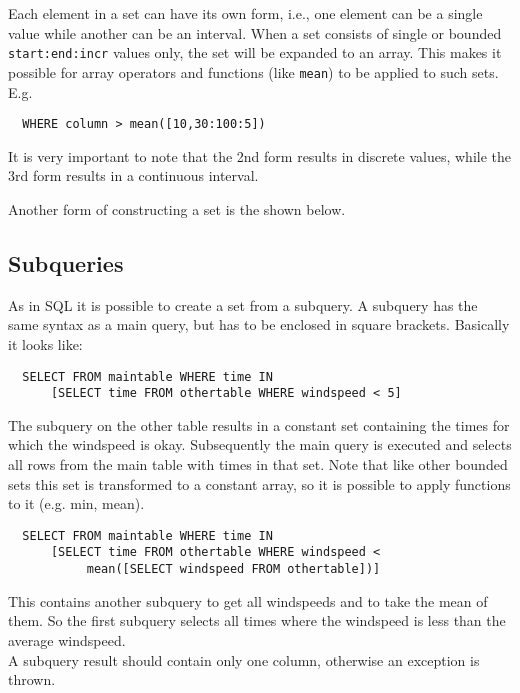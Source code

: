 Each element in a set can have its own form, i.e., one element can
be a single value while another can be an interval.
When a set consists of single or bounded
\texttt{start:end:incr} values only, the set will be expanded to an
array.
This makes it possible for array operators and functions
(like \texttt{mean}) to be applied to such sets. E.g.
\begin{verbatim}
  WHERE column > mean([10,30:100:5])
\end{verbatim}
It is very important to note that the 2nd form results in
discrete values, while the 3rd form results in a continuous interval.

Another form of constructing a set is the
 shown below.

\subsection{\label{TAQL:SUBQUERIES}Subqueries}
As in SQL it is possible to create a set from a subquery. A
subquery has the same syntax as a main query, but has to be
enclosed in square brackets. Basically it looks like:
\begin{verbatim}
  SELECT FROM maintable WHERE time IN
      [SELECT time FROM othertable WHERE windspeed < 5]
\end{verbatim}
The subquery on the other table results in a constant set containing the times
for which the windspeed is okay. Subsequently the main query
is executed and selects all rows from the main table with times in
that set.
Note that like other bounded sets this set is transformed to a
constant array, so it is possible to apply functions to it (e.g. min, mean).
\begin{verbatim}
  SELECT FROM maintable WHERE time IN
      [SELECT time FROM othertable WHERE windspeed <
           mean([SELECT windspeed FROM othertable])]
\end{verbatim}
This contains another subquery to get all windspeeds and
to take the mean of them. So the first subquery selects all times
where the windspeed is less than the average windspeed.
\\A subquery result should contain only one column, otherwise
an exception is thrown.

